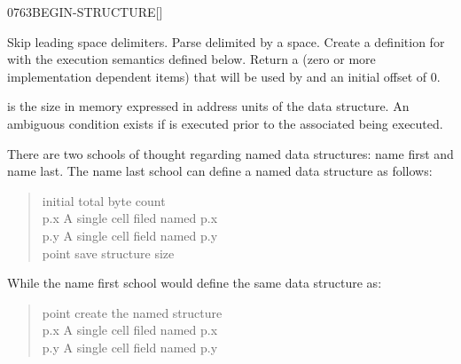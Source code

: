 \vspace*{-3ex}\enlargethispage{8ex}
\begin{worddef}{0763}{BEGIN-STRUCTURE}[]%
\item {}

	Skip leading space delimiters. Parse  delimited
	by a space. Create a definition for  with the
	execution semantics defined below.  Return a 
	(zero or more implementation dependent items) that will be
	used by  and an initial offset of 0.

\execute[name]

	 is the size in memory expressed in address units of
	the data structure.  An ambiguous condition exists if
	 is executed prior to the associated
	 being executed.


	\begin{rationale} %
		There are two schools of thought regarding named data
		structures: name first and name last.  The name last
		school can define a named data structure as follows:

		\begin{quote} \tab[11.5]  initial total byte count \\
		   p.x	\tab {} A single cell filed named p.x \\
		   p.y   \tab {} A single cell field named p.y \\
		 point \tab[3.8]  save structure size
		\end{quote}

		While the name first school would define the same data
		structure as:

		\begin{quote}\ttfamily
		 point \tab[-.3]  create the named structure \\
		   p.x	\tab {} A single cell filed named p.x \\
		   p.y   \tab {} A single cell field named p.y \\
		\end{quote}


\end{rationale}
\end{worddef}
